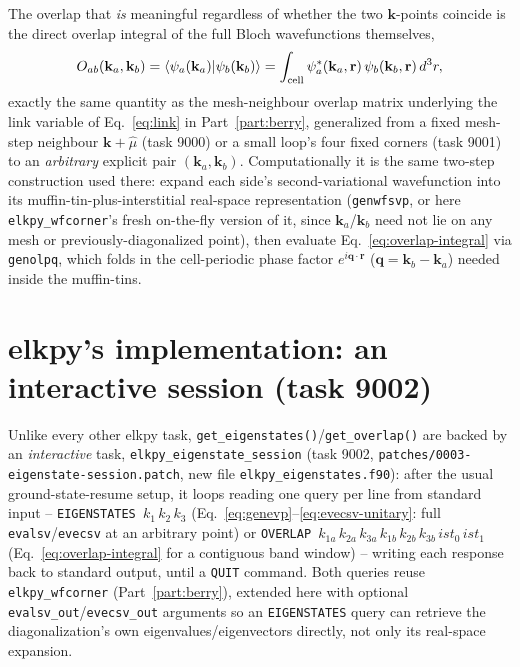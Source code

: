 \documentclass[11pt]{article}
\begin{document}
The overlap that \emph{is} meaningful regardless of whether the two $\mathbf k$-points
coincide is the direct overlap integral of the full Bloch wavefunctions themselves,
\begin{equation}
  O_{ab}(\mathbf k_a,\mathbf k_b) = \langle \psi_a(\mathbf k_a) | \psi_b(\mathbf k_b) \rangle
  = \int_{\rm cell} \psi_a^*(\mathbf k_a,\mathbf r)\,\psi_b(\mathbf k_b,\mathbf r)\,d^3r,
  \label{eq:overlap-integral}
\end{equation}
exactly the same quantity as the mesh-neighbour overlap matrix underlying the link variable
of Eq.~\eqref{eq:link} in Part~\ref{part:berry}, generalized from a fixed mesh-step
neighbour $\mathbf k+\hat\mu$ (task 9000) or a small loop's four fixed corners (task 9001) to
an \emph{arbitrary} explicit pair $(\mathbf k_a,\mathbf k_b)$. Computationally it is the same
two-step construction used there: expand each side's second-variational wavefunction into its
muffin-tin-plus-interstitial real-space representation (\texttt{genwfsvp}, or here
\texttt{elkpy\_wfcorner}'s fresh on-the-fly version of it, since $\mathbf k_a$/$\mathbf k_b$
need not lie on any mesh or previously-diagonalized point), then evaluate
Eq.~\eqref{eq:overlap-integral} via \texttt{genolpq}, which folds in the cell-periodic phase
factor $e^{i\mathbf q\cdot\mathbf r}$ ($\mathbf q = \mathbf k_b-\mathbf k_a$) needed inside the
muffin-tins.

\section{elkpy's implementation: an interactive session (task 9002)}

Unlike every other elkpy task, \texttt{get\_eigenstates()}/\texttt{get\_overlap()} are backed
by an \emph{interactive} task, \texttt{elkpy\_eigenstate\_session} (task 9002,
\texttt{patches/0003-eigenstate-session.patch}, new file \texttt{elkpy\_eigenstates.f90}):
after the usual ground-state-resume setup, it loops reading one query per line from standard
input -- \texttt{EIGENSTATES $k_1\,k_2\,k_3$} (Eq.~\eqref{eq:genevp}--\eqref{eq:evecsv-unitary}:
full \texttt{evalsv}/\texttt{evecsv} at an arbitrary point) or \texttt{OVERLAP $k_{1a}\,k_{2a}\,
k_{3a}\,k_{1b}\,k_{2b}\,k_{3b}\,ist_0\,ist_1$} (Eq.~\eqref{eq:overlap-integral} for a
contiguous band window) -- writing each response back to standard output, until a
\texttt{QUIT} command. Both queries reuse \texttt{elkpy\_wfcorner} (Part~\ref{part:berry}),
extended here with optional \texttt{evalsv\_out}/\texttt{evecsv\_out} arguments so an
\texttt{EIGENSTATES} query can retrieve the diagonalization's own eigenvalues/eigenvectors
directly, not only its real-space expansion.
\end{document}
